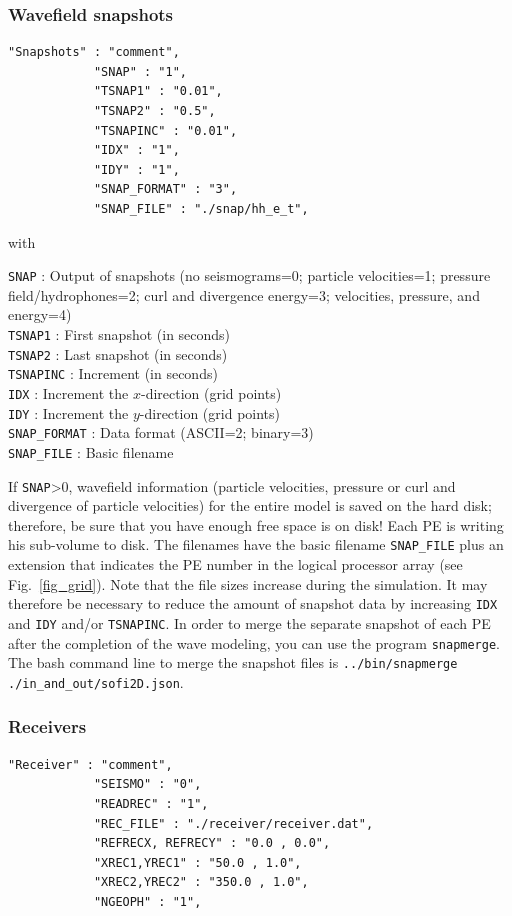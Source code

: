 \subsubsection{Wavefield snapshots}
\begin{verbatim}
"Snapshots" : "comment",
            "SNAP" : "1",
            "TSNAP1" : "0.01",
            "TSNAP2" : "0.5",
            "TSNAPINC" : "0.01",
            "IDX" : "1",
            "IDY" : "1",
            "SNAP_FORMAT" : "3",
            "SNAP_FILE" : "./snap/hh_e_t",
\end{verbatim}

with

\texttt{SNAP} : Output of snapshots (no seismograms=0; particle velocities=1; pressure field/hydrophones=2; curl and divergence energy=3; velocities, pressure, and energy=4)\\
\texttt{TSNAP1} : First snapshot (in seconds)\\
\texttt{TSNAP2} : Last snapshot (in seconds)\\
\texttt{TSNAPINC} : Increment (in seconds)\\
\texttt{IDX} : Increment the $x$-direction (grid points)\\
\texttt{IDY} : Increment the $y$-direction (grid points)\\
\texttt{SNAP\_FORMAT} : Data format (ASCII=2; binary=3)\\
\texttt{SNAP\_FILE} : Basic filename

If \texttt{SNAP}>0, wavefield information (particle velocities, pressure or curl and divergence of particle velocities) for the entire model is saved on the hard disk; therefore, be sure that you have enough free space is on disk! Each PE is writing his sub-volume to disk. The filenames have the basic filename \texttt{SNAP\_FILE} plus an extension that indicates the PE number in the logical processor array (see Fig.~\ref{fig_grid}). Note that the file sizes increase during the simulation. It may therefore be necessary to reduce the amount of snapshot data by increasing \texttt{IDX} and \texttt{IDY} and/or \texttt{TSNAPINC}. In order to merge the separate snapshot of each PE after the completion of the wave modeling, you can use the program \texttt{snapmerge}. The bash command line to merge the snapshot files is \texttt{../bin/snapmerge ./in\_and\_out/sofi2D.json}.

\subsubsection{Receivers}
\begin{verbatim}
"Receiver" : "comment",
            "SEISMO" : "0",
            "READREC" : "1",
            "REC_FILE" : "./receiver/receiver.dat",
            "REFRECX, REFRECY" : "0.0 , 0.0",
            "XREC1,YREC1" : "50.0 , 1.0",
            "XREC2,YREC2" : "350.0 , 1.0",
            "NGEOPH" : "1",
\end{verbatim}

